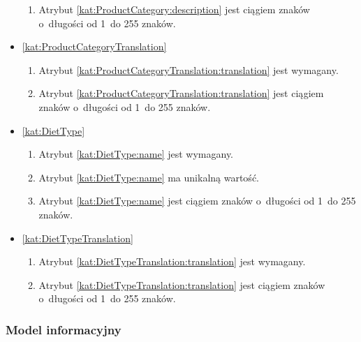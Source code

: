 \begin{itemize}[label={\textbf{Ograniczenia dla}}, wide, labelwidth=!, labelindent=0pt]
\begin{enumerate}[label={\textbf{OGR/2/\protect\twodigits{\arabic{enumi}}}}, wide, labelwidth=!, align=left, leftmargin=3cm, resume]
        \item Atrybut \ref{kat:ProductCategory:description} jest ciągiem znaków o~długości od 1~do 255 znaków.
    \end{enumerate}

    \item\ref{kat:ProductCategoryTranslation}\mynobreakpar
    \begin{enumerate}[label={\textbf{OGR/2/\protect\twodigits{\arabic{enumi}}}}, wide, labelwidth=!, align=left, leftmargin=3cm, resume]
        \item Atrybut \ref{kat:ProductCategoryTranslation:translation} jest wymagany.

        \item Atrybut \ref{kat:ProductCategoryTranslation:translation} jest ciągiem znaków o~długości od 1~do 255 znaków.
    \end{enumerate}

    \item\ref{kat:DietType}\mynobreakpar
    \begin{enumerate}[label={\textbf{OGR/2/\protect\twodigits{\arabic{enumi}}}}, wide, labelwidth=!, align=left, leftmargin=3cm, resume]
        \item Atrybut \ref{kat:DietType:name} jest wymagany.

        \item Atrybut \ref{kat:DietType:name} ma unikalną wartość.

        \item Atrybut \ref{kat:DietType:name} jest ciągiem znaków o~długości od 1~do 255 znaków.
    \end{enumerate}

    \item\ref{kat:DietTypeTranslation}\mynobreakpar
    \begin{enumerate}[label={\textbf{OGR/2/\protect\twodigits{\arabic{enumi}}}}, wide, labelwidth=!, align=left, leftmargin=3cm, resume]
        \item Atrybut \ref{kat:DietTypeTranslation:translation} jest wymagany.

        \item Atrybut \ref{kat:DietTypeTranslation:translation} jest ciągiem znaków o~długości od 1~do 255 znaków.
    \end{enumerate}
\end{itemize}

\subsubsection{Model informacyjny}\label{subsubsec:database:products:domainModel}

